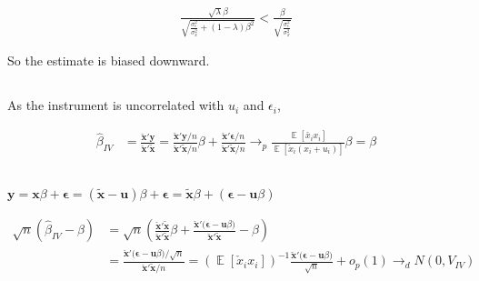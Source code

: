 \documentclass[12pt]{article}
\begin{document}
\begin{equation}
\begin{split}
\frac{\sqrt\lambda\beta}{\sqrt{\frac{\sigma_\epsilon^2}{\sigma_x^2} + (1-\lambda)\beta^2}} < \frac{\beta}{\sqrt{\frac{\sigma_\epsilon^2}{\sigma_x^2}}}
 \end{split}
 \end{equation}

 So the estimate is biased downward.


 \subsection{}


As the instrument is uncorrelated with $u_i$ and $\epsilon_i$,

\begin{equation}
\begin{split}
\hat{\beta}_{IV} & = \frac{\mathbf{\check{x}'y}}{\mathbf{\check{x}'\tilde{x}}}  = \frac{\mathbf{\check{x}'y}/n}{\mathbf{\check{x}'\tilde{x}}/n}\beta  +  \frac{\mathbf{\check{x}'\epsilon}/n}{\mathbf{\check{x}'\tilde{x}}/n} \rightarrow_p
\frac{\mathop{\mathbb{E}}[\check{x_i} x_i ]}{\mathop{\mathbb{E}}[\check{x}_i(x_i + u_i)]}\beta = \beta
\end{split}
\end{equation}

\subsection{}

$ \mathbf{y} = \mathbf{x}\beta + \mathbf{\epsilon} =  \mathbf{(\tilde{x} - u)}\beta + \mathbf{\epsilon}
=  \mathbf{\tilde{x}}\beta + (\mathbf{\epsilon- u}\beta) $



\begin{equation}
\begin{split}
\sqrt{n}(\hat{\beta}_{IV}  - \beta) & = \sqrt{n}\left(\frac{\mathbf{\check{x}'\tilde{x}}}{\mathbf{\check{x}'\tilde{x}}}\beta
+ \frac{\mathbf{\check{x}'(\epsilon- u}\beta)}{\mathbf{\check{x}'\tilde{x}}} - \beta\right) \\
& = \frac{\mathbf{\check{x}'(\epsilon- u}\beta)/\sqrt{n}}{\mathbf{\check{x}'\tilde{x}}/n}
= (\mathop{\mathbb{E}}[\check{x}_i x_i])^{-1} \frac{\mathbf{\check{x}'(\epsilon- u}\beta)}{\sqrt{n}} +o_p(1) \rightarrow_d N(0,V_{IV})
\end{split}
\end{equation}
\end{document}
